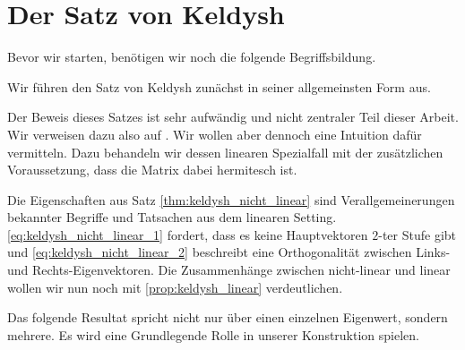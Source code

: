\section{Der Satz von Keldysh}

Bevor wir starten, benötigen wir noch die folgende Begriffsbildung.




Wir führen den Satz von Keldysh zunächst in seiner allgemeinsten Form aus.



Der Beweis dieses Satzes ist sehr aufwändig und nicht zentraler Teil dieser Arbeit.
Wir verweisen dazu also auf \cite{BEYN20123839}.
Wir wollen aber dennoch eine Intuition dafür vermitteln.
Dazu behandeln wir dessen linearen Spezialfall mit der zusätzlichen Voraussetzung, dass die Matrix dabei hermitesch ist.



Die Eigenschaften aus Satz \ref{thm:keldysh_nicht_linear} sind Verallgemeinerungen bekannter Begriffe und Tatsachen aus dem linearen Setting.
\eqref{eq:keldysh_nicht_linear_1} fordert, dass es keine Hauptvektoren $2$-ter Stufe gibt und \eqref{eq:keldysh_nicht_linear_2} beschreibt eine Orthogonalität zwischen Links- und Rechts-Eigenvektoren.
Die Zusammenhänge zwischen nicht-linear und linear wollen wir nun noch mit \ref{prop:keldysh_linear} verdeutlichen.





% 

% 
% 

Das folgende Resultat spricht nicht nur über einen einzelnen Eigenwert, sondern mehrere.
Es wird eine Grundlegende Rolle in unserer Konstruktion spielen.



